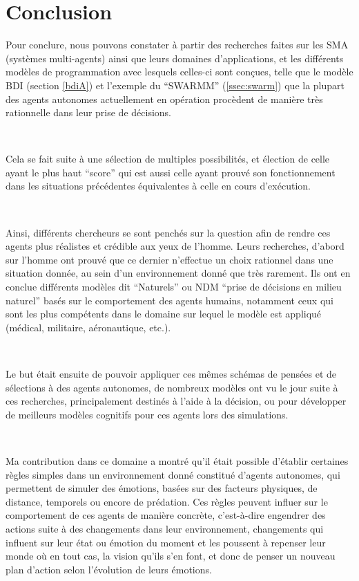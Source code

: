 \chapter{Conclusion} %

\label{Chapter4} %

Pour conclure, nous pouvons constater à partir des recherches faites sur les SMA (systèmes multi-agents) ainsi que leurs domaines d’applications, et les différents modèles de programmation avec lesquels celles-ci sont conçues, telle que le modèle BDI (section \ref{bdiA}) et l'exemple du “SWARMM” (\ref{ssec:swarm}) que la plupart des agents autonomes  actuellement en opération procèdent de manière très rationnelle dans leur prise de décisions.

~\par
Cela se fait suite à une sélection de multiples possibilités, et élection de celle ayant le plus haut “score” qui est aussi celle ayant prouvé son fonctionnement dans les situations précédentes équivalentes à celle en cours d'exécution.

~\par
Ainsi, différents chercheurs se sont penchés sur la question afin de rendre ces agents plus réalistes et crédible aux yeux de l’homme. Leurs recherches, d’abord sur l’homme ont prouvé que ce dernier n'effectue un choix rationnel dans une situation donnée, au sein d’un environnement donné que très rarement. Ils ont en conclue différents modèles dit “Naturels” ou NDM “prise de décisions en milieu naturel” basés sur le comportement des agents humains, notamment ceux qui sont les plus compétents dans le domaine sur lequel le modèle est appliqué (médical, militaire, aéronautique, etc.).

~\par
Le but était ensuite de pouvoir appliquer ces mêmes schémas de pensées et de sélections à des agents autonomes, de nombreux modèles ont vu le jour suite à ces recherches, principalement destinés à l’aide à la décision, ou pour développer de meilleurs modèles cognitifs pour ces agents lors des simulations.

~\par
Ma contribution dans ce domaine a montré qu’il était possible d’établir certaines règles simples dans un environnement donné constitué d’agents autonomes, qui permettent de simuler des émotions, basées sur des facteurs physiques, de distance, temporels ou encore de prédation. Ces règles peuvent influer sur le comportement de ces agents de manière concrète, c’est-à-dire engendrer des actions suite à des changements dans leur environnement, changements qui influent sur leur état ou émotion du moment et les poussent à repenser leur monde où en tout cas, la vision qu’ils s’en font, et donc de penser un nouveau plan d’action selon l’évolution de leurs émotions.


